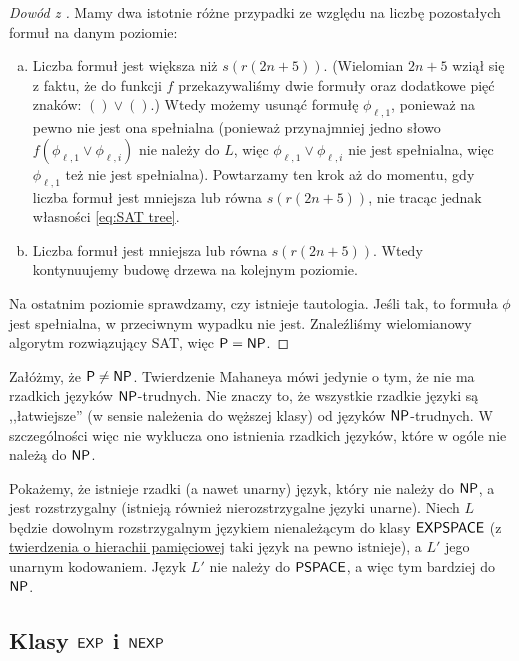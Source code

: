\begin{proof}[Dowód z \cite{Grochow}]
    Mamy dwa istotnie różne przypadki ze względu na liczbę pozostałych formuł na danym poziomie:
    \begin{enumerate}[(a)]
        \item Liczba formuł jest większa niż $s(r(2n + 5))$. (Wielomian $2n + 5$ wziął się z faktu, że do funkcji $f$ przekazywaliśmy dwie formuły oraz dodatkowe pięć znaków: $() \lor ()$.)
        Wtedy możemy usunąć formułę $\phi_{\ell, 1}$, ponieważ na pewno nie jest ona spełnialna (ponieważ przynajmniej jedno słowo $f(\phi_{\ell, 1} \lor \phi_{\ell, i})$ nie należy do $L$, więc $\phi_{\ell, 1} \lor \phi_{\ell, i}$ nie jest spełnialna, więc $\phi_{\ell, 1}$ też nie jest spełnialna).
        Powtarzamy ten krok aż do momentu, gdy liczba formuł jest mniejsza lub równa $s(r(2n + 5))$, nie tracąc jednak własności \ref{eq:SAT tree}.
        \item Liczba formuł jest mniejsza lub równa $s(r(2n + 5))$. Wtedy kontynuujemy budowę drzewa na kolejnym poziomie.
    \end{enumerate}

    Na ostatnim poziomie sprawdzamy, czy istnieje tautologia. Jeśli tak, to formuła $\phi$ jest spełnialna, w przeciwnym wypadku nie jest.
    Znaleźliśmy wielomianowy algorytm rozwiązujący SAT, więc $\textsf{P} = \textsf{NP}$.
\end{proof}

\begin{remark}
    Załóżmy, że $\textsf{P} \neq \textsf{NP}$. Twierdzenie Mahaneya mówi jedynie o tym, że nie ma rzadkich języków $\textsf{NP}$-trudnych. Nie znaczy to, że wszystkie rzadkie języki są ,,łatwiejsze'' (w sensie należenia do węższej klasy) od języków $\textsf{NP}$-trudnych. W szczególności więc nie wyklucza ono istnienia rzadkich języków, które w ogóle nie należą do $\textsf{NP}$.

    Pokażemy, że istnieje rzadki (a nawet unarny) język, który nie należy do $\textsf{NP}$, a jest rozstrzygalny (istnieją również nierozstrzygalne języki unarne).
    Niech $L$ będzie dowolnym rozstrzygalnym językiem nienależącym do klasy $\textsf{EXPSPACE}$ (z \href{https://en.wikipedia.org/wiki/Space_hierarchy_theorem}{twierdzenia o hierachii pamięciowej} taki język na pewno istnieje), a $L'$ jego unarnym kodowaniem. Język $L'$ nie należy do $\textsf{PSPACE}$, a więc tym bardziej do $\textsf{NP}$.
\end{remark}

\subsection{Klasy $\textsf{EXP}$ i $\textsf{NEXP}$}

